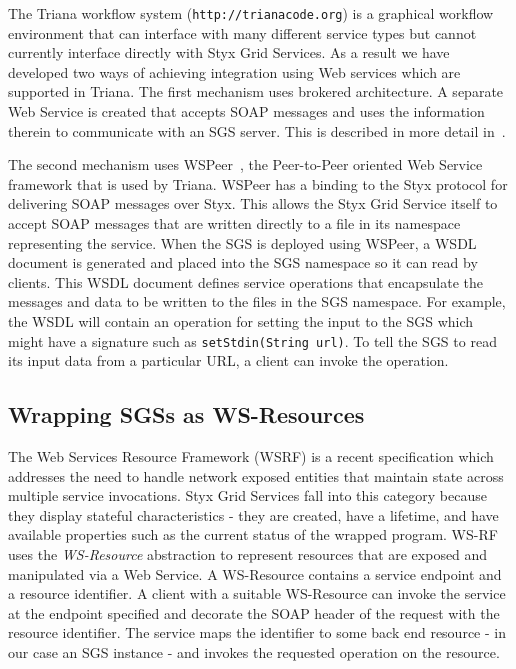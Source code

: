 \documentclass[a4paper]{article}
\begin{document}
The Triana workflow system (\texttt{http://trianacode.org}) is a graphical workflow environment that can interface with many different service types but cannot currently interface directly with Styx Grid Services.  As a result we have developed two ways of achieving integration using Web services which are supported in Triana. The first mechanism uses brokered architecture. A separate Web Service is created that accepts SOAP messages and uses the information therein to communicate with an SGS server. This is described in more detail in~\cite{blower:2005}.

The second mechanism uses WSPeer~\cite{wspeer}, the Peer-to-Peer oriented Web Service framework that is used by Triana. WSPeer has a binding to the Styx protocol for delivering SOAP messages over Styx. This allows the Styx Grid Service itself to accept SOAP messages that are written directly to a file in its namespace representing the service.  When the SGS is deployed using WSPeer, a WSDL document is generated and placed into the SGS namespace so it can read by clients. This WSDL document defines service operations that encapsulate the messages and data to be written to the files in the SGS namespace. For example, the WSDL will contain an operation for setting the input to the SGS which might have a signature such as  \texttt{setStdin(String url)}. To tell the SGS to read its input data from a particular URL, a client can invoke the operation. 

\subsection{Wrapping SGSs as WS-Resources}\label{subsec:ws-resources}

The Web Services Resource Framework (WSRF) is a recent specification which addresses the need to handle network exposed entities that maintain state across multiple service invocations. Styx Grid Services fall into this category because they display stateful characteristics - they are created, have a lifetime, and have available properties such as the current status of the wrapped program. WS-RF uses the \textit{WS-Resource} abstraction to represent resources that are exposed and manipulated via a Web Service. A WS-Resource contains a service endpoint and a resource identifier. A client with a suitable WS-Resource can invoke the service at the endpoint specified and decorate the SOAP header of the request with the resource identifier. The service maps the identifier to some back end resource - in our case an SGS instance - and invokes the requested operation on the resource.
\end{document}
